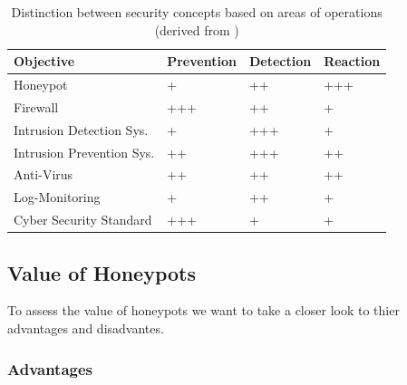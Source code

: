 \begin{table}[h]
    \centering
    \caption{Distinction between security concepts based on areas of operations (derived from \cite{NawrockiWSKS2016})}
    \begin{tabular}{l|lll}
        Objective                 & Prevention & Detection & Reaction \\ \hline
        Honeypot                  & +          & ++        & +++      \\
        Firewall                  & +++        & ++        & +        \\
        Intrusion Detection Sys.  & +          & +++       & +        \\
        Intrusion Prevention Sys. & ++         & +++       & ++       \\
        Anti-Virus                & ++         & ++        & ++       \\
        Log-Monitoring            & +          & ++        & +        \\
        Cyber Security Standard   & +++        & +         & +        \\
    \end{tabular}
    \label{tab:honeypots-security-concepts}
\end{table}

\subsection{Value of Honeypots}

To assess the value of honeypots we want to take a closer look to thier advantages and disadvantes.\cite{Mokube2007} \cite{Kaur2014} \cite{Spitzner2003}

\subsubsection{Advantages}

